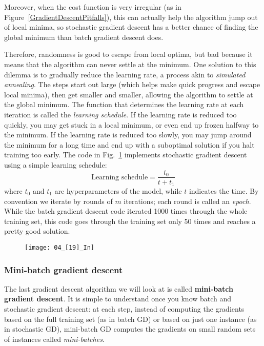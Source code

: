 Moreover, when the cost function is very irregular (as in Figure~\ref{GradientDescentPitfalls}), this can actually help the algorithm jump out of local minima, so stochastic gradient descent has a better chance of finding the global minimum than batch gradient descent does.

Therefore, randomness is good to escape from local optima, but bad because it means that the algorithm can never settle at the minimum. One solution to this dilemma is to gradually reduce the learning rate, a process akin to \emph{simulated annealing}. The steps start out large (which helps make quick progress and escape local minima), then get smaller and smaller, allowing the algorithm to settle at the global minimum. The function that determines the learning rate at each iteration is called the \emph{learning schedule}. If the learning rate is reduced too quickly, you may get stuck in a local minimum, or even end up frozen halfway to the minimum. If the learning rate is reduced too slowly, you may jump around the minimum for a long time and end up with a suboptimal solution if you halt training too early. The code in Fig.~\ref{04_[19]_In} implements stochastic gradient descent using a simple learning schedule:
\begin{equation}
\text{Learning schedule}=\frac{t_0}{t+t_1}
\end{equation}
where $t_0$ and $t_1$ are hyperparameters of the model, while $t$ indicates the time. By convention we iterate by rounds of $m$ iterations; each round is called an \emph{epoch}. While the batch gradient descent code iterated \num{1000} times through the whole training set, this code goes through the training set only 50 times and reaches a pretty good solution.
\begin{figure}[h!t]
\centering
\texttt{[image: 04\_[19]\_In]}
\caption{}\label{04_[19]_In}
\end{figure}
\subsubsection{Mini-batch gradient descent}
The last gradient descent algorithm we will look at is called \textbf{mini-batch gradient descent}. It is simple to understand once you know batch and stochastic gradient descent: at each step, instead of computing the gradients based on the full training set (as in batch GD) or based on just one instance (as in stochastic GD), mini-batch GD computes the gradients on small random sets of instances called \emph{mini-batches}.

